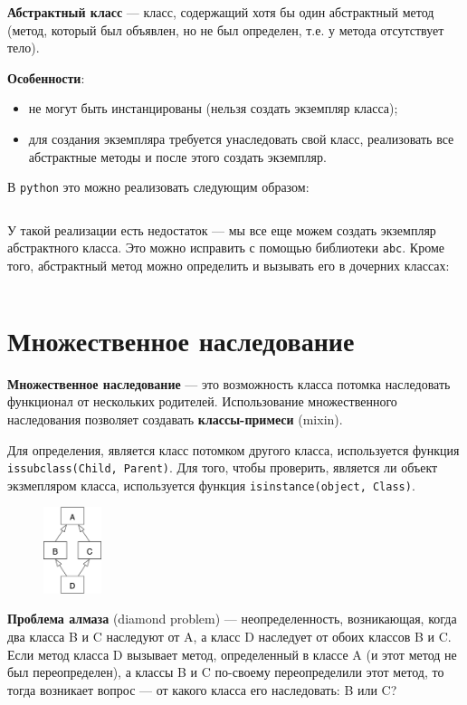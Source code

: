 \documentclass[a4paper,12pt,oneside]{extbook}
\begin{document}
\textbf{Абстрактный класс} — класс, содержащий хотя бы один абстрактный метод (метод, который был объявлен, но не был определен, т.е. у метода отсутствует тело).

\textbf{Особенности}:
\begin{itemize}
    \item не могут быть инстанцированы (нельзя создать экземпляр класса);
    \item для создания экземпляра требуется унаследовать свой класс, реализовать все абстрактные методы и после этого создать экземпляр.
\end{itemize}

В \texttt{python} это можно реализовать следующим образом:
\inputminted{python}{./examples/abstract-vanila.py}

У такой реализации есть недостаток — мы все еще можем создать экземпляр абстрактного класса. Это можно исправить с помощью библиотеки \texttt{abc}. Кроме того, абстрактный метод можно определить и вызывать его в дочерних классах:
\inputminted{python}{./examples/abstract-abc.py}

\section{Множественное наследование}%
\label{sec:Множественное наследование}

\textbf{Множественное наследование} — это возможность класса потомка наследовать функционал от нескольких родителей. Использование множественного наследования позволяет создавать \textbf{классы-примеси} (mixin).

Для определения, является класс потомком другого класса, используется функция \texttt{issubclass(Child, Parent)}. Для того, чтобы проверить, является ли объект экзмепляром класса, используется функция \texttt{isinstance(object, Class)}.

\begin{figure}
    \begin{center}
        \includegraphics[width=0.15\textwidth]{diamond.png}
    \end{center}
\end{figure}
\textbf{Проблема алмаза} (diamond problem) — неопределенность, возникающая, когда два класса B и C наследуют от A, а класс D наследует от обоих классов B и C. Если метод класса D вызывает метод, определенный в классе A (и этот метод не был переопределен), а классы B и C по-своему переопределили этот метод, то тогда возникает вопрос — от какого класса его наследовать: B или C?
\end{document}
